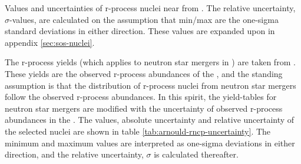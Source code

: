 

\begin{table}[h]
  \centering
  
  \caption[Values and uncertainties of observed r-process abundances in the \sos]{\label{tab:arnould-rncp-uncertainty}
    Values and uncertainties of r-process nuclei near  from .
    The relative uncertainty, $\sigma$-values, are calculated on the assumption that min/max are the one-sigma standard deviations in either direction.
    These values are expanded upon in appendix \ref{sec:sos-nuclei}.
  }
\end{table}

The r-process yields (which applies to neutron star mergers in \omegamodel) are taken from .
These yields are the observed r-process abundances of the \sos, and the standing assumption is that the distribution of r-process nuclei from neutron star mergers follow the observed r-process abundances.
In this spirit, the yield-tables for neutron star mergers are modified with the uncertainty of observed r-process abundances in the \sos.
The values, absolute uncertainty and relative uncertainty of the selected nuclei are shown in table \ref{tab:arnould-rncp-uncertainty}.
The minimum and maximum values are interpreted as one-sigma deviations in either direction, and the relative uncertainty, $\sigma$ is calculated thereafter.

